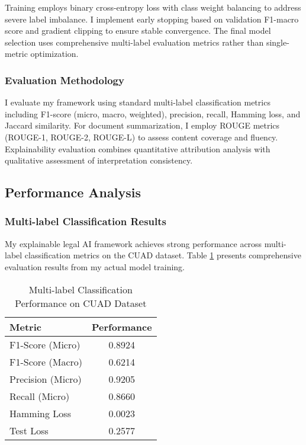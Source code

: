Training employs binary cross-entropy loss with class weight balancing to address severe label imbalance. I implement early stopping based on validation F1-macro score and gradient clipping to ensure stable convergence. The final model selection uses comprehensive multi-label evaluation metrics rather than single-metric optimization.

\subsubsection{Evaluation Methodology}
I evaluate my framework using standard multi-label classification metrics including F1-score (micro, macro, weighted), precision, recall, Hamming loss, and Jaccard similarity. For document summarization, I employ ROUGE metrics (ROUGE-1, ROUGE-2, ROUGE-L) to assess content coverage and fluency. Explainability evaluation combines quantitative attribution analysis with qualitative assessment of interpretation consistency.

\subsection{Performance Analysis}
\label{subsec:performance_analysis}

\subsubsection{Multi-label Classification Results}
My explainable legal AI framework achieves strong performance across multi-label classification metrics on the CUAD dataset. Table \ref{tab:classification_results} presents comprehensive evaluation results from my actual model training.

\begin{table}[ht]
\centering
\caption{Multi-label Classification Performance on CUAD Dataset}
\label{tab:classification_results}
\begin{tabular}{|l|c|}
\hline
\textbf{Metric} & \textbf{Performance} \\
\hline
F1-Score (Micro) & 0.8924 \\
F1-Score (Macro) & 0.6214 \\
Precision (Micro) & 0.9205 \\
Recall (Micro) & 0.8660 \\
Hamming Loss & 0.0023 \\
Test Loss & 0.2577 \\
\hline
\end{tabular}
\end{table}

